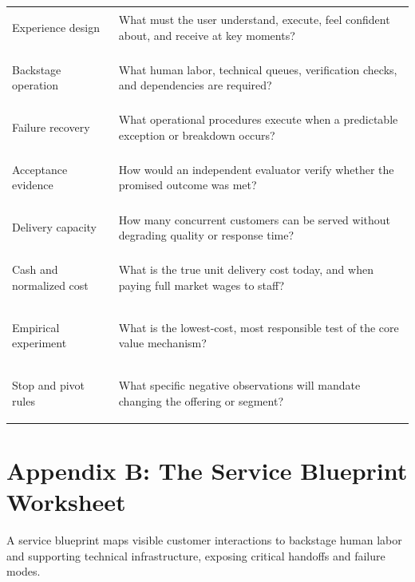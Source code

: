 \begin{table}[t]
\begin{tabularx}{\textwidth}{>{\bfseries\raggedright\arraybackslash}p{} >{\raggedright\arraybackslash}X}
Experience design & What must the user understand, execute, feel confident about, and receive at key moments? \\
Backstage operation & What human labor, technical queues, verification checks, and dependencies are required? \\
Failure recovery & What operational procedures execute when a predictable exception or breakdown occurs? \\
Acceptance evidence & How would an independent evaluator verify whether the promised outcome was met? \\
Delivery capacity & How many concurrent customers can be served without degrading quality or response time? \\
Cash and normalized cost & What is the true unit delivery cost today, and when paying full market wages to staff? \\
Empirical experiment & What is the lowest-cost, most responsible test of the core value mechanism? \\
Stop and pivot rules & What specific negative observations will mandate changing the offering or segment? \\
\bottomrule
\end{tabularx}
\end{table}

\section*{Appendix B: The Service Blueprint Worksheet}

A service blueprint maps visible customer interactions to backstage human labor and supporting technical infrastructure, exposing critical handoffs and failure modes.

